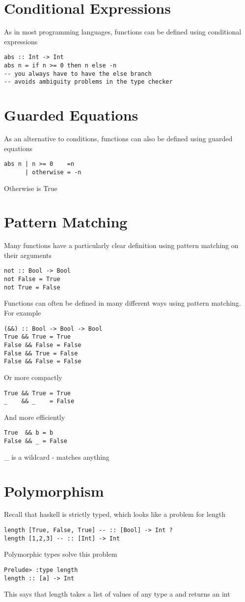 \documentclass{article}[18pt]
\begin{document}
\section{Conditional Expressions}
As in most programming languages, functions can be defined using conditional expressions
\begin{verbatim}
abs :: Int -> Int
abs n = if n >= 0 then n else -n
-- you always have to have the else branch
-- avoids ambiguity problems in the type checker
\end{verbatim}
\section{Guarded Equations}
As an alternative to conditions, functions can also be defined using guarded equations
\begin{verbatim}
abs n | n >= 0    =n
      | otherwise = -n
\end{verbatim}
Otherwise is True
\section{Pattern Matching}
Many functions have a particularly clear definition using pattern matching on their arguments
\begin{verbatim}
not :: Bool -> Bool
not False = True
not True = False
\end{verbatim}
Functions can often be defined in many different ways using pattern matching. For example
\begin{verbatim}
(&&) :: Bool -> Bool -> Bool
True && True = True
False && False = False
False && True = False
False && False = False
\end{verbatim}
Or more compactly
\begin{verbatim}
True && True = True
_    && _    = False
\end{verbatim}
And more efficiently
\begin{verbatim}
True  && b = b
False && _ = False
\end{verbatim}
\_ is a wildcard - matches anything
\section{Polymorphism}
Recall that haskell is strictly typed, which looks like a problem for length
\begin{verbatim}
length [True, False, True] -- :: [Bool] -> Int ?
length [1,2,3] -- :: [Int] -> Int
\end{verbatim}
Polymorphic types solve this problem
\begin{verbatim}
Prelude> :type length
length :: [a] -> Int
\end{verbatim}
This says that length takes a list of values of any type a and returns an int
\end{document}
